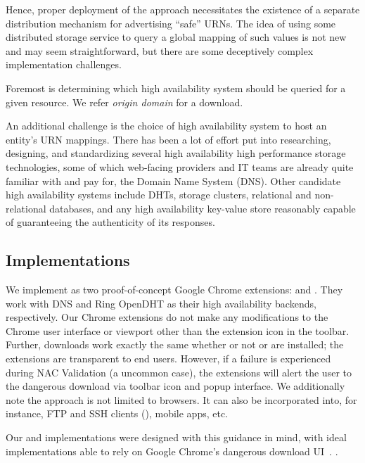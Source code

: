 Hence, proper deployment of the \SYSTEM{} approach necessitates the existence of
a separate distribution mechanism for advertising ``safe'' URNs. The idea of
using some distributed storage service to query a global mapping of such values
is not new and may seem straightforward, but there are some deceptively complex
implementation challenges.

Foremost is determining which high availability system should be queried for a
given resource. We refer \emph{origin domain} for a download. 

An additional challenge is the choice of high availability system to host an
entity's URN mappings. There has been a lot of effort put into researching,
designing, and standardizing several high availability high performance storage
technologies, some of which web-facing providers and IT teams are already quite
familiar with and pay for, \eg the Domain Name System (DNS). Other candidate
high availability systems include DHTs, storage clusters, relational and
non-relational databases, and any high availability key-value store reasonably
capable of guaranteeing the authenticity of its responses.

\subsection{Implementations}

We implement \SYSTEM{} as two proof-of-concept Google Chrome extensions:
\DNSSYS{} and \DHTSYS{}. They work with DNS and Ring OpenDHT as their high
availability backends, respectively. Our Chrome extensions do not make any
modifications to the Chrome user interface or viewport other than the extension
icon in the toolbar. Further, downloads work exactly the same whether or not
\DNSSYS{} or \DHTSYS{} are installed; the extensions are transparent to end
users. However, if a failure is experienced during NAC Validation (\ie a
uncommon case), the extensions will alert the user to the dangerous download via
toolbar icon and popup interface. We additionally note the \SYSTEM{} approach is
not limited to browsers. It can also be incorporated into, for instance, FTP and
SSH clients (), mobile apps, etc.

Our \DNSSYS{} and \DHTSYS{} implementations were designed with this guidance in
mind, with ideal implementations able to rely on Google Chrome's dangerous
download UI~\cite{ChromeClickThrough}. .

